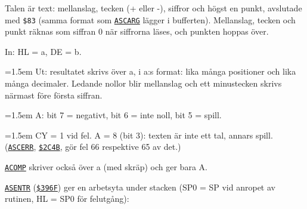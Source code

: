 \begin{Listing}
\Gap
{}
\begin{Note}\par\noindent Talen är text: mellanslag, tecken (+ eller -), siffror och högst en punkt, avslutade med \texttt{\$83} (samma format som \hyperlink{l:ASCARG}{\texttt{ASCARG}} lägger i bufferten). Mellanslag, tecken och punkt räknas som siffran 0 när siffrorna läses, och punkten hoppas över.\par
\par\noindent In:  HL = a, DE = b.\par
\par\noindent\hangindent=1.5em Ut:  resultatet skrivs över a, i a:s format: lika många positioner och lika många decimaler. Ledande nollor blir mellanslag och ett minustecken skrivs närmast före första siffran.\par
\par\noindent\hangindent=1.5em A: bit 7 = negativt, bit 6 = inte noll, bit 5 = spill.\par
\par\noindent\hangindent=1.5em CY = 1 vid fel. A = 8 (bit 3): texten är inte ett tal, annars spill. (\hyperlink{l:ASCERR}{\texttt{ASCERR}}, \hyperlink{a:2C4B}{\texttt{\$2C4B}}, gör fel 66 respektive 65 av det.)\par
\par\noindent \hyperlink{l:ACOMP}{\texttt{ACOMP}} skriver också över a (med skräp) och ger bara A.\par
\par\noindent \hyperlink{l:ASENTR}{\texttt{ASENTR}} (\hyperlink{a:396F}{\texttt{\$396F}}) ger en arbetsyta under stacken (SP0 = SP vid anropet av rutinen, HL{} = SP0 för felutgång):\par
\begin{Verb}

\end{Verb}
\end{Note}
\end{Listing}
